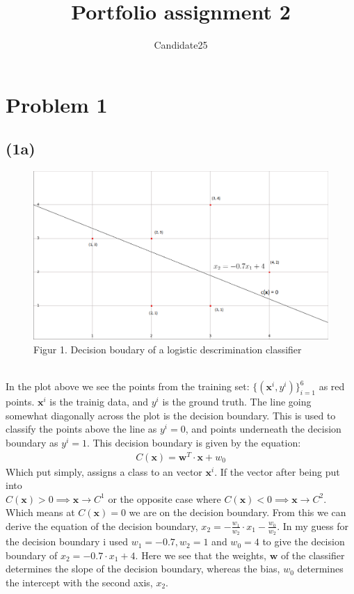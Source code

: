 \documentclass[12pt, letterpaper]{article}
\title{Portfolio assignment 2}
\author{Candidate25}
\date{}
\newcommand{\bs}{\boldsymbol}
\newcommand{\mbf}{\mathbf}
\begin{document}
  \section*{Problem 1}
    \subsection*{(1a)}
      \begin{figure}[h]
        \caption{Figur 1. Decision boudary of a logistic descrimination classifier}
        \centering
        \includegraphics[width=\textwidth,keepaspectratio=true,height=\textheight-\the\textundbildtextheight]{decisionboundary_1a}
      \end{figure}\\
      In the plot above we see the points from the training set: $\{(\mbf{x}^i, y^i)\}_{i=1}^6$ as red points. $\mbf{x}^i$ is the trainig data, and $y^i$ is the ground truth. The line going somewhat diagonally across the plot is the decision boundary. This is used to classify the points above the line as $y^i = 0$, and points underneath the decision boundary as $y^i = 1$. This decision boundary is given by the equation:
      \begin{align} \label{eq1}
        C(\mbf{x}) = \bs{w}^T \cdot \mbf{x} + w_0
      \end{align}
      Which put simply, assigns a class to an vector $\mbf{x}^i$. If the vector after being put into\\ $C(\mbf{x}) > 0 \implies \mbf{x} \rightarrow C^1$ or the opposite case where $C(\mbf{x}) < 0 \implies \mbf{x} \rightarrow C^2$. Which means at $C(\mbf{x}) = 0$ we are on the decision boundary. From this we can derive the equation of the decision boundary, $x_2 = -\frac{w_1}{w_2}\cdot x_1 - \frac{w_0}{w_2}$. In my guess for the decision boundary i used $w_1 = -0.7, w_2 = 1$ and $ w_0 = 4$ to give the decision boundary of $x_2 = -0.7 \cdot x_1 + 4$. Here we see that the weights, $\bs{w}$ of the classifier determines the slope of the decision boundary, whereas the bias, $w_0$ determines the intercept with the second axis, $x_2$.\\
\end{document}
